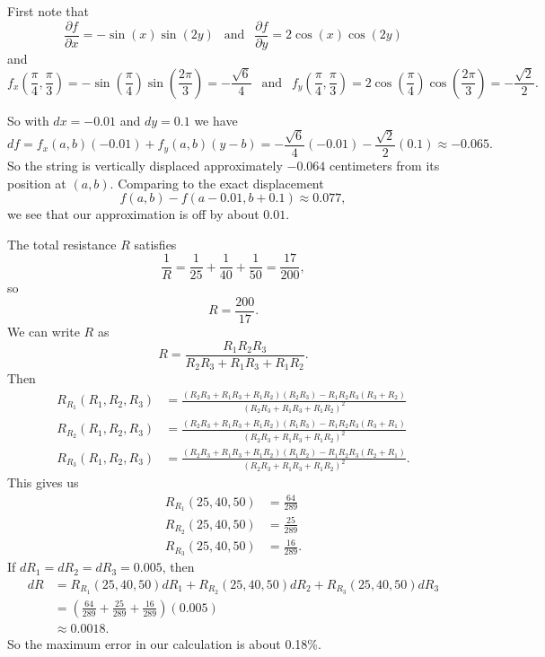 \begin{exercises}
\begin{exerciseSolution}
\ba
\item First note that
\[\frac{\partial f}{\partial x} = -\sin(x)\sin(2y) \ \ \text{ and } \ \ \frac{\partial f}{\partial y} = 2\cos(x)\cos(2y)\]
and
\[f_x\left(\frac{\pi}{4}, \frac{\pi}{3}\right) = -\sin\left(\frac{\pi}{4}\right)\sin\left(\frac{2\pi}{3}\right) = -\frac{\sqrt{6}}{4} \ \ \text{ and } \ \ f_y\left(\frac{\pi}{4}, \frac{\pi}{3}\right) = 2\cos\left(\frac{\pi}{4}\right)\cos\left(\frac{2\pi}{3}\right) = -\frac{\sqrt{2}}{2}.\]

So with $dx = -0.01$ and $dy = 0.1$ we have 
\[df = f_x(a,b)(-0.01) + f_y(a,b)(y-b) = -\frac{\sqrt{6}}{4}(-0.01) - \frac{\sqrt{2}}{2}(0.1) \approx -0.065.\]
So the string is vertically displaced approximately $-0.064$ centimeters from its position at $(a,b)$. Comparing to the exact displacement
\[f(a,b) - f(a-0.01, b+0.1) \approx 0.077,\]
we see that our approximation is off by about $0.01$.

\item The total resistance $R$ satisfies 
\[\frac{1}{R} = \frac{1}{25} + \frac{1}{40} + \frac{1}{50} = \frac{17}{200},\]
so 
\[R = \frac{200}{17}.\]
We can write $R$ as 
\[R = \frac{R_1R_2R_3}{R_2R_3+R_1R_3+R_1R_2}.\]
Then
\begin{align*}
R_{R_1}(R_1,R_2,R_3) &= \frac{(R_2R_3+R_1R_3+R_1R_2)(R_2R_3)-R_1R_2R_3(R_3+R_2)}{(R_2R_3+R_1R_3+R_1R_2)^2} \\
R_{R_2}(R_1,R_2,R_3) &= \frac{(R_2R_3+R_1R_3+R_1R_2)(R_1R_3)-R_1R_2R_3(R_3+R_1)}{(R_2R_3+R_1R_3+R_1R_2)^2} \\
R_{R_3}(R_1,R_2,R_3) &= \frac{(R_2R_3+R_1R_3+R_1R_2)(R_1R_2)-R_1R_2R_3(R_2+R_1)}{(R_2R_3+R_1R_3+R_1R_2)^2}.
\end{align*}
This gives us
\begin{align*}
R_{R_1}(25, 40, 50) &= \frac{64}{289} \\
R_{R_2}(25, 40, 50) &= \frac{25}{289}  \\
R_{R_3}(25, 40, 50) &= \frac{16}{289}.
\end{align*}
If $dR_1 = dR_2 = dR_3 = 0.005$, then 
\begin{align*}
dR &= R_{R_1}(25, 40, 50) dR_1 + R_{R_2}(25, 40, 50) dR_2 + R_{R_3}(25, 40, 50) dR_3 \\
	&= \left(\frac{64}{289} + \frac{25}{289} + \frac{16}{289} \right) (0.005) \\
	&\approx 0.0018.
\end{align*}
So the maximum error in our calculation is about 0.18\%. 

\ea
\end{exerciseSolution}
\end{exercises}
\afterexercises

